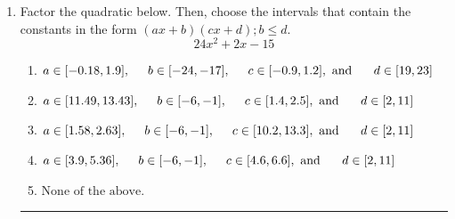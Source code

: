 \documentclass[14pt]{extbook}
\newcommand{\litem}[1]{\item#1\hspace*{-1cm}\rule{\textwidth}{0.4pt}}
\begin{document}
\begin{enumerate}
{\begin{enumerate}[label=\Alph*.]
\end{enumerate} }
\litem{
Factor the quadratic below. Then, choose the intervals that contain the constants in the form $(ax+b)(cx+d); b \leq d.$\[ 24x^{2} +2 x -15 \]\begin{enumerate}[label=\Alph*.]
\item \( a \in [-0.18, 1.9], \hspace*{5mm} b \in [-24, -17], \hspace*{5mm} c \in [-0.9, 1.2], \text{ and } \hspace*{5mm} d \in [19, 23] \)
\item \( a \in [11.49, 13.43], \hspace*{5mm} b \in [-6, -1], \hspace*{5mm} c \in [1.4, 2.5], \text{ and } \hspace*{5mm} d \in [2, 11] \)
\item \( a \in [1.58, 2.63], \hspace*{5mm} b \in [-6, -1], \hspace*{5mm} c \in [10.2, 13.3], \text{ and } \hspace*{5mm} d \in [2, 11] \)
\item \( a \in [3.9, 5.36], \hspace*{5mm} b \in [-6, -1], \hspace*{5mm} c \in [4.6, 6.6], \text{ and } \hspace*{5mm} d \in [2, 11] \)
\item \( \text{None of the above.} \)

\end{enumerate} }
\end{enumerate}
\end{document}
